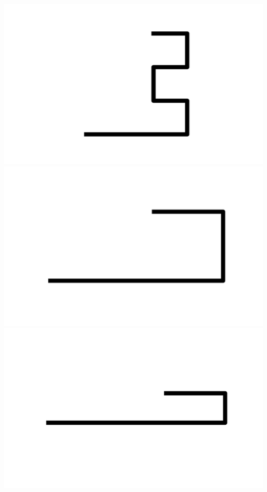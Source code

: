 \documentclass[]{report}
\begin{document}
\includegraphics[scale=.1]{pictures/21/state_cluster_shapes_145.pdf} 
\includegraphics[scale=.1]{pictures/21/state_cluster_shapes_146.pdf} 
\includegraphics[scale=.1]{pictures/21/state_cluster_shapes_147.pdf} 
\end{document}
